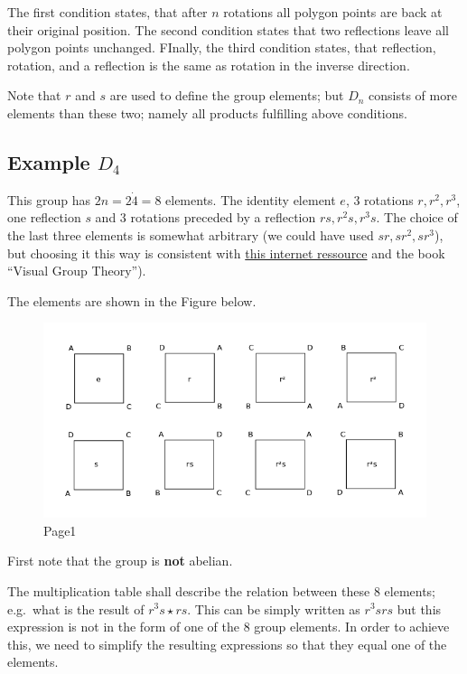 The first condition states, that after \(n\) rotations all polygon
points are back at their original position. The second condition states
that two reflections leave all polygon points unchanged. FInally, the
third condition states, that reflection, rotation, and a reflection is
the same as rotation in the inverse direction.

Note that \(r\) and \(s\) are used to define the group elements; but
\(D_n\) consists of more elements than these two; namely all products
fulfilling above conditions.

\subsection{Example $D_4$}

This group has \(2n = 2 \dot 4 = 8\) elements. The identity element
\(e\), 3 rotations \(r, r^2, r^3\), one reflection \(s\) and 3 rotations
preceded by a reflection \(rs, r^2s, r^3s\). The choice of the last
three elements is somewhat arbitrary (we could have used
\(sr, sr^2, sr^3\)), but choosing it this way is consistent with
\href{http://groupprops.subwiki.org/wiki/Dihedral_group:D8}{this
internet ressource} and the book ``Visual Group Theory'').

The elements are shown in the Figure below.

\begin{figure}[H]
\centering
\includegraphics[scale=0.7]{images/groups_04_3.png}
\caption{Page1}
\end{figure}

First note that the group is \textbf{not} abelian.

The multiplication table shall describe the relation between these 8
elements; e.g.~what is the result of \(r^3s \star rs\). This can be
simply written as \(r^3srs\) but this expression is not in the form of
one of the 8 group elements. In order to achieve this, we need to
simplify the resulting expressions so that they equal one of the
elements.

